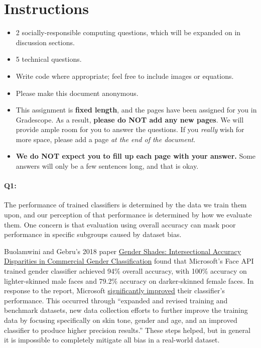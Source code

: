 \maketitle
\thispagestyle{fancy}
\vspace{-3cm}

\section*{Instructions}
\begin{itemize}
  \item 2 socially-responsible computing questions, which will be expanded on in discussion sections.
  \item 5 technical questions.
  \item Write code where appropriate; feel free to include images or equations.
  \item Please make this document anonymous.
  \item This assignment is \textbf{fixed length}, and the pages have been assigned for you in Gradescope. As a result, \textbf{please do NOT add any new pages}. We will provide ample room for you to answer the questions. If you \emph{really} wish for more space, please add a page \emph{at the end of the document}.
  \item \textbf{We do NOT expect you to fill up each page with your answer.} Some answers will only be a few sentences long, and that is okay.
\end{itemize}
\pagebreak

\paragraph{Q1:} The performance of trained classifiers is determined by the data we train them upon, and our perception of that performance is determined by how we evaluate them. One concern is that evaluation using overall accuracy can mask poor performance in specific subgroups caused by dataset bias.

Buolamwini and Gebru's 2018 paper \href{http://proceedings.mlr.press/v81/buolamwini18a/buolamwini18a.pdf}{Gender Shades: Intersectional Accuracy Disparities in Commercial Gender Classification} found that Microsoft's Face API trained gender classifier achieved 94\% overall accuracy, with 100\% accuracy on lighter-skinned male faces and 79.2\% accuracy on darker-skinned female faces. In response to the report, Microsoft \href{https://blogs.microsoft.com/ai/gender-skin-tone-facial-recognition-improvement/}{significantly improved} their classifier's performance. This occurred through ``expanded and revised training and benchmark datasets, new data collection efforts to further improve the training data by focusing specifically on skin tone, gender and age, and an improved classifier to produce higher precision results.'' These steps helped, but in general it is impossible to completely mitigate all bias in a real-world dataset. 

